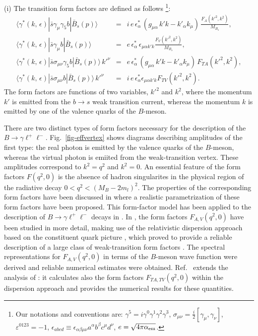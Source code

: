 \documentclass{PoS}
\begin{document}
\noindent(i) The transition form factors are defined as follows \cite{kruger,mn2004}\footnote{Our notations and conventions are: 
$\gamma^5=i\gamma^0\gamma^1\gamma^2\gamma^3$, 
$\sigma_{\mu\nu}=\frac{i}{2}[\gamma_{\mu},\gamma_{\nu}]$, 
$\varepsilon^{0123}=-1$, $\epsilon_{abcd}\equiv
\epsilon_{\alpha\beta\mu\nu}a^\alpha b^\beta c^\mu d^\nu$, 
$e=\sqrt{4\pi\alpha_{\rm em}}$.}:
\begin{eqnarray}
\label{real}
\label{ffs}
\nonumber
\langle
\gamma^* (k,\,\epsilon)|\bar s \gamma_\mu\gamma_5 b|\bar B_s(p)\rangle 
&=& 
i\, e\,\epsilon^*_{\alpha}\, \left ( g_{\mu\alpha} \, k'k-k'_\alpha k_\mu \right )\,\frac{F_A(k'^2,k^2)}{M_{B_s}}, 
\\
\langle \gamma^*(k,\,\epsilon)|\bar s\gamma_\mu b|\bar B_s(p)\rangle
&=& 
e\,\epsilon^*_{\alpha}\,\epsilon_{\mu\alpha k' k}\frac{F_V(k'^2,k^2)}{M_{B_s}},   
\\
\langle\gamma^*(k,\,\epsilon)|\bar s \sigma_{\mu\nu}\gamma_5 b|\bar B_s(p) 
\rangle\, k'^{\nu}
&=& 
e\,\epsilon^*_{\alpha}\,\left( g_{\mu\alpha}\,k'k- k'_{\alpha}k_{\mu}\right)\, 
F_{TA}(k'^2, k^2), 
\nonumber
\\
\langle
\gamma^*(k,\,\epsilon)|\bar s \sigma_{\mu\nu} b|\bar B_s(p)\rangle\, k'^{\nu}
&=& 
i\, e\,\epsilon^*_{\alpha}\epsilon_{\mu\alpha k' k}F_{TV}(k'^2, k^2).
\nonumber 
\end{eqnarray}
The form factors are functions of two variables, $k'^2$ and $k^2$, where the momentum $k'$ is emitted from the $b\to s$ weak transition current, whereas the 
momentum $k$ is emitted by one of the valence quarks of the $B$-meson. 

There are two distinct types of form factors necessary for the description of the $B\to \gamma \ell^+\ell^-$. 
Fig.~\ref{fig-effvertex} shows diagrams describing amplitudes of the first type: the real photon is emitted by the 
valence quarks of the $B$-meson, whereas the virtual photon is emiited from the weak-transition vertex. 
These amplitudes correspond to $k^2=q^2$ and $k^2=0$. An essential feature of the form factors $F(q^2,0)$ is the absence of hadron singularites in the physical 
region of the radiative decay $0<q^2<(M_B-2m_l)^2$. The properties of the corresponding form factors have been discussed 
in \cite{kruger} where a realistic parametrization of these form factors have been proposed. This form-factor model has been applied to the description 
of $B\to \gamma \ell^+\ell^-$ decays in \cite{mn2004}. In \cite{kmn2016}, the form factors $F_{A,V}(q^2,0)$ have been studied in more detail, making use 
of the relativistic dispersion approach based on the constituent quark picture \cite{m}, which proved to provide a reliable description of a large class 
of weak-transition form factors \cite{ms}. The spectral representations for $F_{A,V}(q^2,0)$ in terms of the $B$-meson 
wave function were derived and reliable numerical estimates were obtained. Ref.~\cite{kmn} extends the analysis of \cite{kmn2016}: it calculates also 
the form factors $F_{TA,TV}(q^2,0)$ within the dispersion approach and provides the numerical results for these quantities. 
\end{document}
